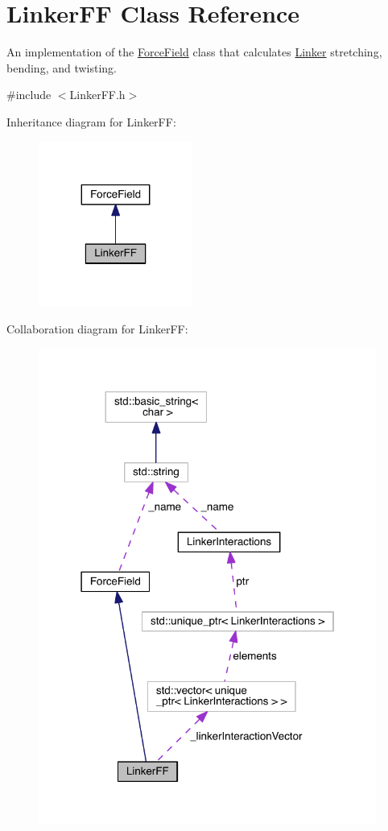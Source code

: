 \hypertarget{classLinkerFF}{\section{Linker\+F\+F Class Reference}
\label{classLinkerFF}
}


An implementation of the \hyperlink{classForceField}{Force\+Field} class that calculates \hyperlink{classLinker}{Linker} stretching, bending, and twisting.  




{\ttfamily \#include $<$Linker\+F\+F.\+h$>$}



Inheritance diagram for Linker\+F\+F\+:\nopagebreak
\begin{figure}[H]
\begin{center}
\leavevmode
\includegraphics[width=143pt]{classLinkerFF__inherit__graph}
\end{center}
\end{figure}


Collaboration diagram for Linker\+F\+F\+:\nopagebreak
\begin{figure}[H]
\begin{center}
\leavevmode
\includegraphics[width=315pt]{classLinkerFF__coll__graph}
\end{center}
\end{figure}
